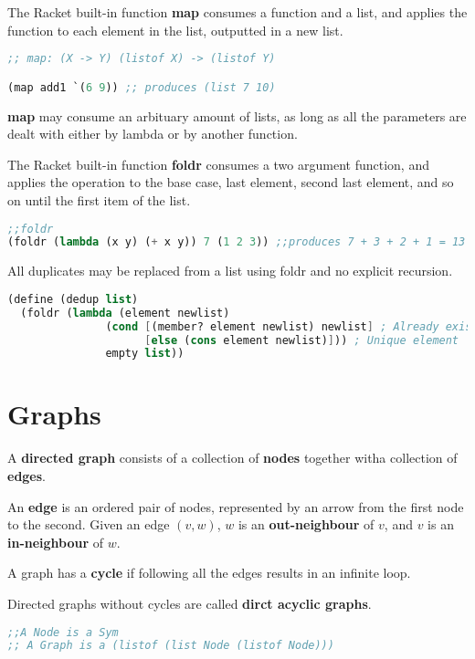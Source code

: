 \documentclass[english, 12pt]{article}
\begin{document}
\begin{defn}
The Racket built-in function \textbf{map} consumes a function and a list, and applies the function to each element in the list, outputted in a new list.
\begin{lstlisting}[language=Scheme]
;; map: (X -> Y) (listof X) -> (listof Y)

(map add1 `(6 9)) ;; produces (list 7 10)
\end{lstlisting}
\begin{note}
\textbf{map} may consume an arbituary amount of lists, as long as all the parameters are dealt with either by lambda or by another function.
\end{note}
\end{defn}
\begin{defn}
The Racket built-in function \textbf{foldr} consumes a two argument function, and applies the operation to the base case, last element, second last element, and so on until the first item of the list.

\begin{lstlisting}[language=Scheme]
;;foldr
(foldr (lambda (x y) (+ x y)) 7 (1 2 3)) ;;produces 7 + 3 + 2 + 1 = 13
\end{lstlisting}
\end{defn}
\begin{exmp}
All duplicates may be replaced from a list using foldr and no explicit recursion.
\begin{lstlisting}[language=Scheme]
(define (dedup list)
  (foldr (lambda (element newlist)
			   (cond [(member? element newlist) newlist] ; Already exists
			         [else (cons element newlist)])) ; Unique element 
			   empty list))
\end{lstlisting}
\end{exmp}
\section{Graphs}
\begin{defn}
A \textbf{directed graph} consists of a collection of \textbf{nodes} together witha  collection of \textbf{edges}.
\end{defn}
\begin{defn}
An \textbf{edge} is an ordered pair of nodes, represented by an arrow from the first node to the second. Given an edge $(v,w)$, $w$ is an \textbf{out-neighbour} of $v$, and $v$ is an \textbf{in-neighbour} of $w$.
\end{defn} 
\begin{defn}
A graph has a \textbf{cycle} if following all the edges results in an infinite loop.
\end{defn}
\begin{defn}
Directed graphs without cycles are called \textbf{dirct acyclic graphs}.
\end{defn}
\begin{lstlisting}[language=Scheme]
;;A Node is a Sym
;; A Graph is a (listof (list Node (listof Node)))
\end{lstlisting}
\end{document}
